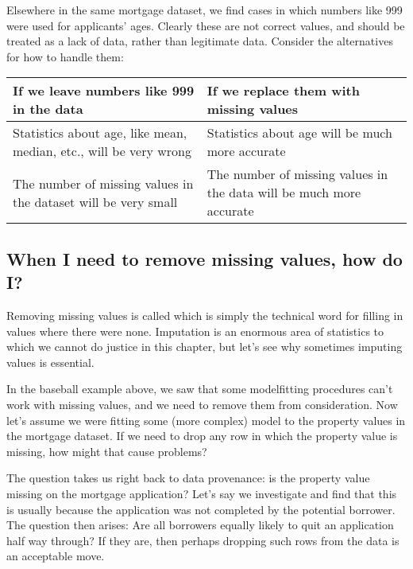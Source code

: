 \documentclass[letterpaper,10pt,english]{sphinxmanual}
\begin{document}
Elsewhere in the same mortgage dataset, we find cases in which numbers like 999 were used for applicants’ ages.  Clearly these are not correct values, and should be treated as a lack of data, rather than legitimate data.  Consider the alternatives for how to handle them:


\begin{savenotes}\sphinxattablestart
\centering
\begin{tabulary}{\linewidth}[t]{|T|T|}
\hline
\sphinxstyletheadfamily 
If we leave numbers like 999 in the data
&\sphinxstyletheadfamily 
If we replace them with missing values
\\
\hline
Statistics about age, like mean, median, etc., will be very wrong
&
Statistics about age will be much more accurate
\\
\hline
The number of missing values in the dataset will be very small
&
The number of missing values in the data will be much more accurate
\\
\hline
\end{tabulary}
\par
\sphinxattableend\end{savenotes}


\subsection{When I need to remove missing values, how do I?}
\label{\detokenize{chapter-13-etl:when-i-need-to-remove-missing-values-how-do-i}}
Removing missing values is called  which is simply the technical word for filling in values where there were none.  Imputation is an enormous area of statistics to which we cannot do justice in this chapter, but let’s see why sometimes imputing values is essential.

In the baseball example above, we saw that some model\sphinxhyphen{}fitting procedures can’t work with missing values, and we need to remove them from consideration.  Now let’s assume we were fitting some (more complex) model to the property values in the mortgage dataset.  If we need to drop any row in which the property value is missing, how might that cause problems?

The question takes us right back to data provenance:   is the property value missing on the mortgage application?  Let’s say we investigate and find that this is usually because the application was not completed by the potential borrower.  The question then arises: Are all borrowers equally likely to quit an application half way through?  If they are, then perhaps dropping such rows from the data is an acceptable move.
\end{document}
